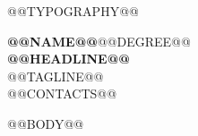 \documentclass[@@SIZE@@pt,@@PAPER@@paper]{extarticle}
\begin{document}
@@TYPOGRAPHY@@
\begin{center}
{\LARGE\bfseries @@NAME@@}{\normalsize\mdseries @@DEGREE@@}\\[2pt]
{\large\bfseries @@HEADLINE@@}\\[1pt]
{\small @@TAGLINE@@}\\[3pt]
{\footnotesize @@CONTACTS@@}
\end{center}
\vspace{-5pt}
@@BODY@@
\end{document}
